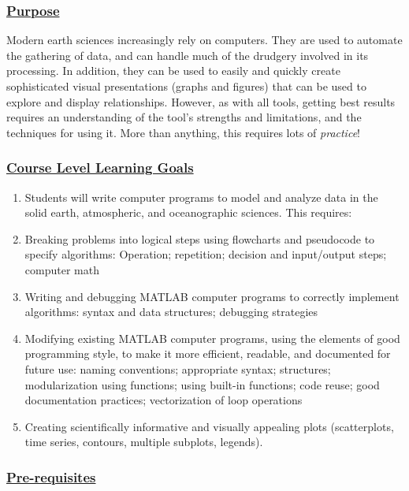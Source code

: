 \documentclass[12pt]{article}
\renewcommand{\section}[1]{\vspace{0pt}\subsubsection*{\underline{\large #1}}\vspace{-10pt}}
\begin{document}

\section{Purpose}
Modern earth sciences increasingly rely on computers. They are used to 
automate the gathering of data,
and can handle much of the drudgery involved in its processing.
In addition, they can be used to easily and quickly create sophisticated
visual presentations (graphs and figures) that can be used to explore
and display relationships. However, as with all tools,  getting best
results requires an understanding of the tool's strengths and
limitations, and the techniques for using it. More than anything, this requires lots of \emph{practice}!

\newpage
\section{Course Level Learning Goals}
 
\begin{enumerate}
\item Students will write computer programs to model and analyze data in 
the solid earth, atmospheric, and oceanographic sciences. This requires:
\item Breaking problems into logical steps  using flowcharts and pseudocode to  specify algorithms: Operation; repetition; decision and input/output steps; computer math
\item Writing and debugging MATLAB computer programs to correctly implement algorithms: syntax and data structures; debugging strategies
\item Modifying existing MATLAB computer programs, using the elements of good programming style, to make it more efficient, readable, and documented for future use:
naming conventions; appropriate syntax; structures; modularization using functions; using built-in functions; code reuse; good documentation practices; vectorization of loop operations
\item Creating scientifically informative and visually appealing plots 
(scatterplots, time series, contours, multiple subplots, legends).  
\end{enumerate}
 
 \section{Pre-requisites}
\end{document}
